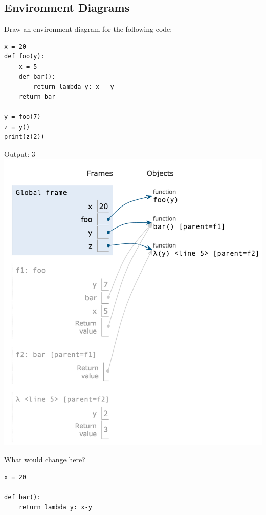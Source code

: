 \documentclass{exam}
\begin{document}
\begin{questions}
\section{Environment Diagrams}
\begin{blocksection}
\question Draw an environment diagram for the following code:

\begin{lstlisting}
x = 20
def foo(y):
    x = 5
    def bar():
        return lambda y: x - y
    return bar

y = foo(7)
z = y()
print(z(2))
\end{lstlisting}

\begin{solution}[2in]
    Output: 3 \newline
    \includegraphics[scale=0.5]{img/foobar.png}
\end{solution}
\end{blocksection}

\begin{blocksection}
\question What would change here?

\begin{lstlisting}
x = 20

def bar():
    return lambda y: x-y


\end{lstlisting}
\end{blocksection}
\end{questions}
\end{document}
